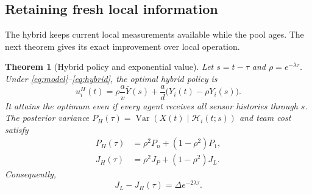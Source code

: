 \documentclass[letterpaper,10pt,conference]{ieeeconf}
\newtheorem{theorem}{Theorem}
\newcommand{\Var}{\operatorname{Var}}
\begin{document}
\subsection{Retaining fresh local information}
The hybrid keeps current local measurements available while the pool ages. The next theorem gives its exact improvement over local operation.
\begin{theorem}[Hybrid policy and exponential value]\label{thm:hybrid}
Let $s=t-\tau$ and $\rho=e^{-\lambda\tau}$. Under \eqref{eq:model}--\eqref{eq:hybrid}, the optimal hybrid policy is
\begin{equation}
 u_i^H(t)=\rho\frac av\bar Y(s)
       +\frac ad\bigl(Y_i(t)-\rho Y_i(s)\bigr).\label{eq:hybridpolicy}
\end{equation}
It attains the optimum even if every agent receives all sensor histories through $s$. The posterior variance $P_H(\tau)=\Var(X(t)\mid\mathcal H_i(t;s))$ and team cost satisfy
\begin{align}
 P_H(\tau)&=\rho^2P_n+(1-\rho^2)P_1,\label{eq:phybrid}\\
 J_H(\tau)&=\rho^2J_P+(1-\rho^2)J_L.\label{eq:jhybrid}
\end{align}
Consequently,
\begin{equation}
 J_L-J_H(\tau)=\Delta e^{-2\lambda\tau}.\label{eq:exponential}
\end{equation}
\end{theorem}
\end{document}
